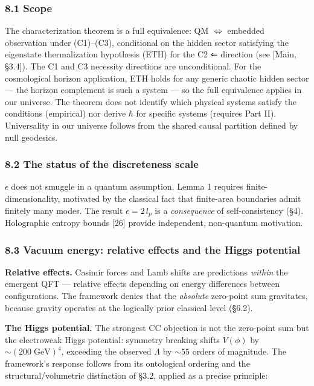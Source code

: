 \documentclass[
]{article}
\begin{document}
\hypertarget{scope}{%
\subsubsection{8.1 Scope}\label{scope}}

The characterization theorem is a full equivalence: QM \(\iff\) embedded
observation under (C1)--(C3), conditional on the hidden sector
satisfying the eigenstate thermalization hypothesis (ETH) for the C2 ⇐
direction (see {[}Main, §3.4{]}). The C1 and C3 necessity directions are
unconditional. For the cosmological horizon application, ETH holds for
any generic chaotic hidden sector --- the horizon complement is such a
system --- so the full equivalence applies in our universe. The theorem
does not identify which physical systems satisfy the conditions
(empirical) nor derive \(\hbar\) for specific systems (requires Part
II). Universality in our universe follows from the shared causal
partition defined by null geodesics.

\hypertarget{the-status-of-the-discreteness-scale}{%
\subsubsection{8.2 The status of the discreteness
scale}\label{the-status-of-the-discreteness-scale}}

\(\epsilon\) does not smuggle in a quantum assumption. Lemma 1 requires
finite-dimensionality, motivated by the classical fact that finite-area
boundaries admit finitely many modes. The result \(\epsilon = 2\,l_p\)
is a \emph{consequence} of self-consistency (§4). Holographic entropy
bounds {[}26{]} provide independent, non-quantum motivation.

\hypertarget{vacuum-energy-relative-effects-and-the-higgs-potential}{%
\subsubsection{8.3 Vacuum energy: relative effects and the Higgs
potential}\label{vacuum-energy-relative-effects-and-the-higgs-potential}}

\textbf{Relative effects.} Casimir forces and Lamb shifts are
predictions \emph{within} the emergent QFT --- relative effects
depending on energy differences between configurations. The framework
denies that the \emph{absolute} zero-point sum gravitates, because
gravity operates at the logically prior classical level (§6.2).

\textbf{The Higgs potential.} The strongest CC objection is not the
zero-point sum but the electroweak Higgs potential: symmetry breaking
shifts \(V(\phi)\) by \(\sim (200\;\text{GeV})^4\), exceeding the
observed \(\Lambda\) by \(\sim 55\) orders of magnitude. The framework's
response follows from its ontological ordering and the
structural/volumetric distinction of §3.2, applied as a precise
principle:
\end{document}

